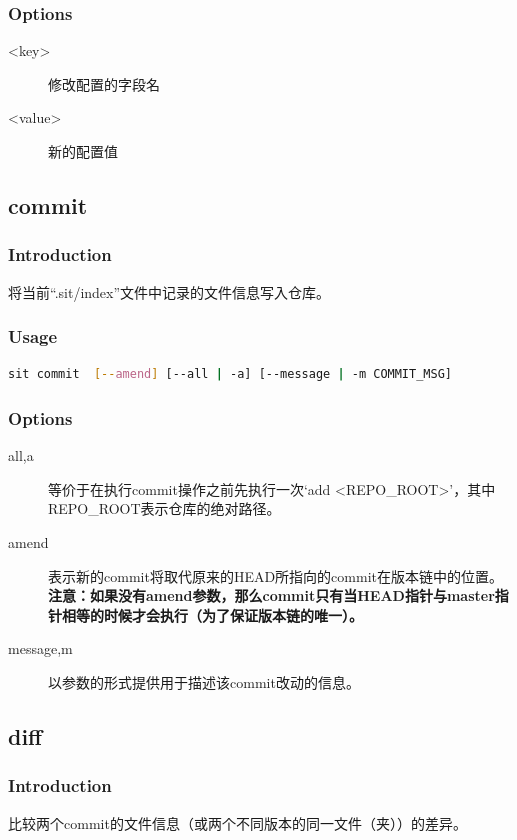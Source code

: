 \documentclass[11pt, a4paper, UTF8]{ctexart}
\begin{document}
\subsubsection*{Options}
\begin{description}
	\item[\YaHeiMono <key>] 修改配置的字段名
	\item[\YaHeiMono <value>] 新的配置值
\end{description}

\subsection{commit}
\subsubsection*{Introduction}
将当前``.sit/index''文件中记录的文件信息写入仓库。
\subsubsection*{Usage}
\begin{lstlisting}[language=sh,basicstyle=\small\YaHeiMono,numbers=none]
sit commit  [--amend] [--all | -a] [--message | -m COMMIT_MSG]
\end{lstlisting}
\subsubsection*{Options}
\begin{description}
	\item[\YaHeiMono all,a] 等价于在执行commit操作之前先执行一次`add <REPO\_ROOT>'，其中REPO\_ROOT表示仓库的绝对路径。
	\item[\YaHeiMono amend] 表示新的commit将取代原来的HEAD所指向的commit在版本链中的位置。\\\textbf{注意：如果没有amend参数，那么commit只有当HEAD指针与master指针相等的时候才会执行（为了保证版本链的唯一）。}
	\item[\YaHeiMono message,m] 以参数的形式提供用于描述该commit改动的信息。
\end{description}

\subsection{diff}
\subsubsection*{Introduction}
比较两个commit的文件信息（或两个不同版本的同一文件（夹））的差异。
\end{document}
